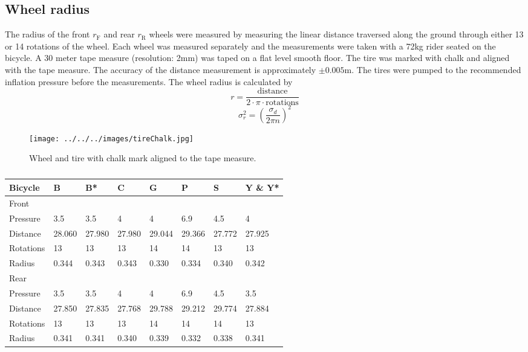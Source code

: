 \documentclass{bmd2010p}
\begin{document}
\subsection{Wheel radius}
The radius of the front $r_\mathrm{F}$ and rear $r_\mathrm{R}$ wheels were
measured by measuring the linear distance traversed along the ground through
either 13 or 14 rotations of the wheel. Each wheel was measured separately and
the measurements were taken with a 72kg rider seated on the bicycle. A 30 meter
tape measure (resolution: 2mm) was taped on a flat level smooth floor. The tire
was marked with chalk and aligned with the tape measure. The accuracy of the
distance measurement is approximately $\pm0.005$m. The tires were pumped to the
recommended inflation pressure before the measurements. The wheel radius is
calculated by
\begin{equation}
	r=\frac{\textrm{distance}}{2\cdot\pi\cdot\textrm{rotations}}
	\label{eq:wheelRadius}
\end{equation}
\begin{equation}
    \sigma_r^{2}=\left(\frac{\sigma_d}{2\pi n}\right)^{2}
    \label{eq:WheelRadVar}
\end{equation}
\begin{figure}[tb]
	\begin{center}
		\texttt{[image: ../../../images/tireChalk.jpg]}
	\end{center}
	\caption{Wheel and tire with chalk mark aligned to the tape measure.}
	\label{fig:tireChalk}
\end{figure}
\begin{table}
	\begin{tabular}{llllllll}
	Bicycle   & B      & B*     & C      & G      & P      & S      & Y \& Y*\\
    \hline
	Front\\
	Pressure  & 3.5    & 3.5    & 4      & 4      & 6.9    & 4.5    & 4      \\
	Distance  & 28.060 & 27.980 & 27.980 & 29.044 & 29.366 & 27.772 & 27.925 \\
	Rotations & 13     & 13     & 13     & 14     & 14     & 13     & 13     \\
	Radius    & 0.344  & 0.343  & 0.343  & 0.330  & 0.334  & 0.340  & 0.342  \\
	Rear\\
	Pressure  & 3.5    & 3.5    & 4      & 4      & 6.9    & 4.5    & 3.5    \\
	Distance  & 27.850 & 27.835 & 27.768 & 29.788 & 29.212 & 29.774 & 27.884 \\
	Rotations & 13     & 13     & 13     & 14     & 14     & 14     & 13     \\
	Radius    & 0.341  & 0.341  & 0.340  & 0.339  & 0.332  & 0.338  & 0.341
	\end{tabular}
	\caption{}
	\label{tab:wheelRadius}
\end{table}
\end{document}
